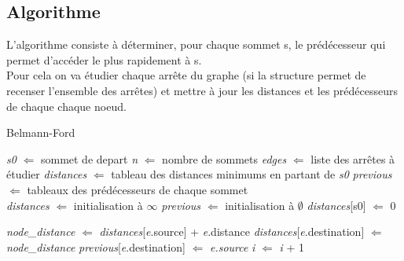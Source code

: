 \documentclass[11pt]{extarticle}
\begin{document}
\subsection{Algorithme}
L'algorithme consiste à déterminer, pour chaque sommet s, le prédécesseur qui permet d'accéder le plus rapidement à s.\\
Pour cela on va étudier chaque arrête du graphe (si la structure permet de recenser l'ensemble des arrêtes) et mettre à jour les distances et les prédécesseurs de chaque chaque noeud.
\begin{algorithm}
\caption{Belmann-Ford}\label{belmann-ford}
\begin{algorithmic}
    \State \textit{s0} $\Leftarrow$ sommet de depart
    \State \textit{n} $\Leftarrow$ nombre de sommets
    \State \textit{edges} $\Leftarrow$ liste des arrêtes à étudier
    \State \textit{distances} $\Leftarrow$ tableau des distances minimums en partant de \textit{s0}
    \State \textit{previous} $\Leftarrow$ tableaux des prédécesseurs de chaque sommet
    \\
	\State \textit{distances} $\Leftarrow$ initialisation à $\infty$
	\State \textit{previous} $\Leftarrow$ initialisation à $\emptyset$
	\State \textit{distances}[s0] $\Leftarrow$ 0
	
    		\State \textit{node\_distance} $\Leftarrow$ \textit{distances}[\textit{e}.source] + \textit{e}.distance
    			\State \textit{distances}[\textit{e}.destination] $\Leftarrow$ \textit{node\_distance}
    			\State \textit{previous}[\textit{e}.destination] $\Leftarrow$ \textit{\textit{e}.source}
    		\EndIf
    	\EndFor
    	\State \textit{i} $\Leftarrow$ \textit{i} + 1
    \EndWhile
\end{algorithmic}
\end{algorithm}
\end{document}
